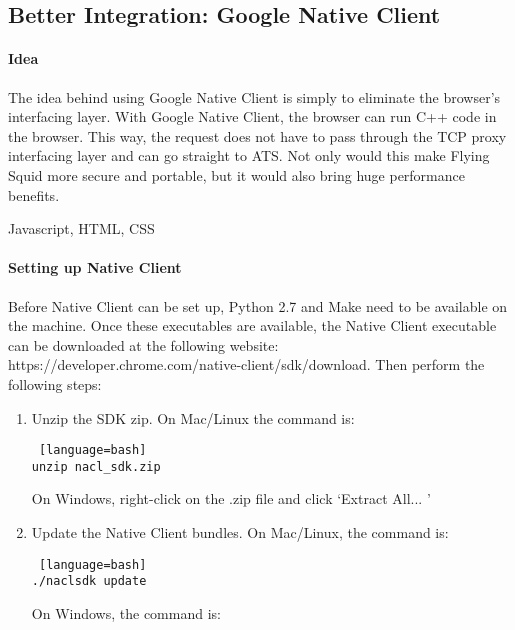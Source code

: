\begin{appendices}



\section{Better Integration: Google Native Client}

\paragraph{Idea}

The idea behind using Google Native Client is simply to eliminate the browser's interfacing layer. With Google Native Client, the browser can run C++ code in the browser. This way, the request does not have to pass through the TCP proxy interfacing layer and can go straight to ATS. Not only would this make Flying Squid more secure and portable, but it would also bring huge performance benefits.

Javascript, HTML, CSS

\paragraph{Setting up Native Client}

Before Native Client can be set up, Python 2.7 and Make need to be available on the machine. Once these executables are available, the Native Client executable can be downloaded at the following website: https://developer.chrome.com/native-client/sdk/download. Then perform the following steps:

\begin{enumerate} 
\item Unzip the SDK zip. On Mac/Linux the command is:

\begin{lstlisting} [language=bash] 
unzip nacl_sdk.zip
\end{lstlisting}

On Windows, right-click on the .zip file and click \lq Extract All... \rq

\item  Update the Native Client bundles. On Mac/Linux, the command is:

\begin{lstlisting} [language=bash] 
./naclsdk update
\end{lstlisting}

On Windows, the command is:


\end{enumerate}
\end{appendices}
